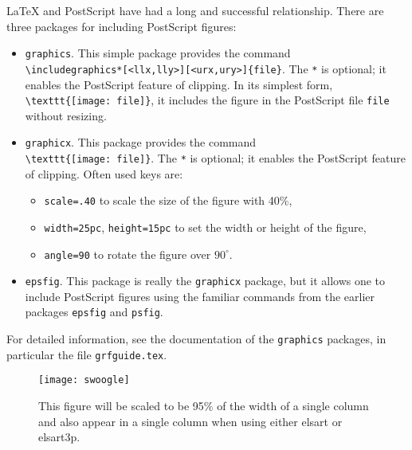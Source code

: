\documentclass{elsart3p}    %
\begin{document}
\LaTeX{} and PostScript have had a long and successful
relationship. There are three packages for including PostScript
figures:

\begin{itemize}

\item \texttt{graphics}.  This simple package provides the
command\\ \verb|\includegraphics*[<llx,lly>][<urx,ury>]{file}|.
The \texttt{*} is optional; it enables the PostScript feature of
clipping.  In its simplest form,\\ \verb|\texttt{[image: file]}|,
it includes the figure in the PostScript file \texttt{file}
without resizing.

\item \texttt{graphicx}.  This package provides the command\\
\verb|\texttt{[image: file]}|.  The \texttt{*}
is optional; it enables the PostScript feature of clipping.
Often used keys are: \def\labelitemii{--} 

\begin{itemize}
\item \texttt{scale=.40} to scale the size of the figure with
  40\%,
\item \texttt{width=25pc}, \texttt{height=15pc} to set the width
  or height of the figure,
\item \texttt{angle=90} to rotate the figure over $90^\circ$.
\end{itemize}

\item \texttt{epsfig}.  This package is really the
\texttt{graphicx} package, but it allows one to include
PostScript figures using the familiar commands from the earlier
packages \texttt{epsfig} and \texttt{psfig}.  

\end{itemize}

For detailed information, see the documentation of the
\texttt{graphics} packages, in particular the file
\texttt{grfguide.tex}.

\begin{figure}

\centering \texttt{[image: swoogle]}

\caption{This figure will be scaled to be 95\% of the width of a
single column and also appear in a single column when using either
elsart or elsart3p.}

\label{fig:exmp}
\end{figure}
\end{document}
